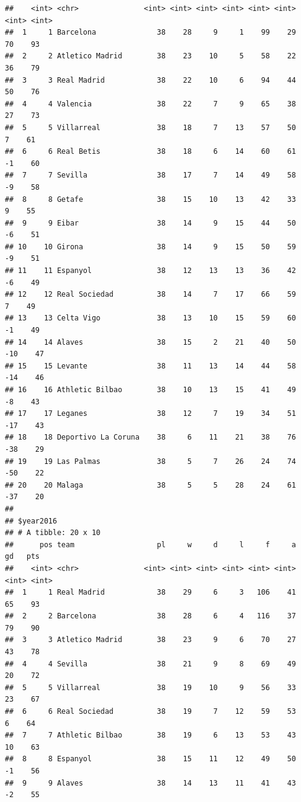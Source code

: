 \documentclass[]{tufte-handout}
\begin{document}
\begin{verbatim}
##    <int> <chr>               <int> <int> <int> <int> <int> <int> <int> <int>
##  1     1 Barcelona              38    28     9     1    99    29    70    93
##  2     2 Atletico Madrid        38    23    10     5    58    22    36    79
##  3     3 Real Madrid            38    22    10     6    94    44    50    76
##  4     4 Valencia               38    22     7     9    65    38    27    73
##  5     5 Villarreal             38    18     7    13    57    50     7    61
##  6     6 Real Betis             38    18     6    14    60    61    -1    60
##  7     7 Sevilla                38    17     7    14    49    58    -9    58
##  8     8 Getafe                 38    15    10    13    42    33     9    55
##  9     9 Eibar                  38    14     9    15    44    50    -6    51
## 10    10 Girona                 38    14     9    15    50    59    -9    51
## 11    11 Espanyol               38    12    13    13    36    42    -6    49
## 12    12 Real Sociedad          38    14     7    17    66    59     7    49
## 13    13 Celta Vigo             38    13    10    15    59    60    -1    49
## 14    14 Alaves                 38    15     2    21    40    50   -10    47
## 15    15 Levante                38    11    13    14    44    58   -14    46
## 16    16 Athletic Bilbao        38    10    13    15    41    49    -8    43
## 17    17 Leganes                38    12     7    19    34    51   -17    43
## 18    18 Deportivo La Coruna    38     6    11    21    38    76   -38    29
## 19    19 Las Palmas             38     5     7    26    24    74   -50    22
## 20    20 Malaga                 38     5     5    28    24    61   -37    20
## 
## $year2016
## # A tibble: 20 x 10
##      pos team                   pl     w     d     l     f     a    gd   pts
##    <int> <chr>               <int> <int> <int> <int> <int> <int> <int> <int>
##  1     1 Real Madrid            38    29     6     3   106    41    65    93
##  2     2 Barcelona              38    28     6     4   116    37    79    90
##  3     3 Atletico Madrid        38    23     9     6    70    27    43    78
##  4     4 Sevilla                38    21     9     8    69    49    20    72
##  5     5 Villarreal             38    19    10     9    56    33    23    67
##  6     6 Real Sociedad          38    19     7    12    59    53     6    64
##  7     7 Athletic Bilbao        38    19     6    13    53    43    10    63
##  8     8 Espanyol               38    15    11    12    49    50    -1    56
##  9     9 Alaves                 38    14    13    11    41    43    -2    55

\end{verbatim}
\end{document}
